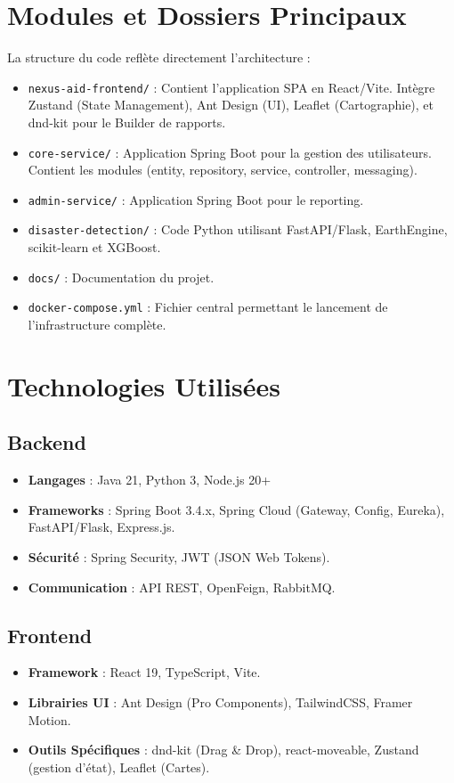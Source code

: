 \documentclass[12pt,a4paper]{report}
\begin{document}
\chapter{Modules et Dossiers Principaux}
La structure du code reflète directement l'architecture :
\begin{itemize}
    \item \texttt{nexus-aid-frontend/} : Contient l'application SPA en React/Vite. Intègre Zustand (State Management), Ant Design (UI), Leaflet (Cartographie), et dnd-kit pour le Builder de rapports.
    \item \texttt{core-service/} : Application Spring Boot pour la gestion des utilisateurs. Contient les modules (entity, repository, service, controller, messaging).
    \item \texttt{admin-service/} : Application Spring Boot pour le reporting.
    \item \texttt{disaster-detection/} : Code Python utilisant FastAPI/Flask, EarthEngine, scikit-learn et XGBoost.
    \item \texttt{docs/} : Documentation du projet.
    \item \texttt{docker-compose.yml} : Fichier central permettant le lancement de l'infrastructure complète.
\end{itemize}

\chapter{Technologies Utilisées}
\section{Backend}
\begin{itemize}
    \item \textbf{Langages} : Java 21, Python 3, Node.js 20+
    \item \textbf{Frameworks} : Spring Boot 3.4.x, Spring Cloud (Gateway, Config, Eureka), FastAPI/Flask, Express.js.
    \item \textbf{Sécurité} : Spring Security, JWT (JSON Web Tokens).
    \item \textbf{Communication} : API REST, OpenFeign, RabbitMQ.
\end{itemize}

\section{Frontend}
\begin{itemize}
    \item \textbf{Framework} : React 19, TypeScript, Vite.
    \item \textbf{Librairies UI} : Ant Design (Pro Components), TailwindCSS, Framer Motion.
    \item \textbf{Outils Spécifiques} : dnd-kit (Drag \& Drop), react-moveable, Zustand (gestion d'état), Leaflet (Cartes).
\end{itemize}
\end{document}
